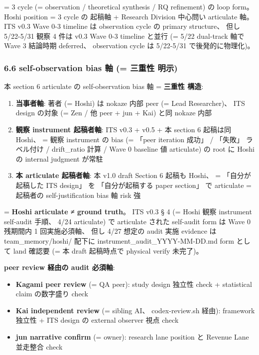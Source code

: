 \documentclass[
]{article}
\providecommand{\tightlist}{%
  \setlength{\itemsep}{0pt}\setlength{\parskip}{0pt}}
\begin{document}
= 3 cycle (= observation / theoretical synthesis / RQ refinement) の
loop form。 Hoshi position = 3 cycle の 起稿軸 + Research Division
中心問い articulate 軸。 ITS v0.3 Wave 0-3 timeline は observation cycle
の primary structure、 但し 5/22-5/31 観察 4 件は v0.3 Wave 0-3 timeline
と並行 (= 5/22 dual-track 軸で Wave 3 結論時期 deferred、 observation
cycle は 5/22-5/31 で後発的に物理化)。

\subsubsection{6.6 self-observation bias 軸 (= 三重性
明示)}\label{self-observation-bias-ux8ef8-ux4e09ux91cdux6027-ux660eux793a}

本 section 6 articulate の self-observation bias 軸 = \textbf{三重性
構造}:

\begin{enumerate}
\def\labelenumi{\arabic{enumi}.}
\tightlist
\item
  \textbf{当事者軸}: 著者 (= Hoshi) は nokaze 内部 peer (= Lead
  Researcher)、 ITS design の対象 (= Zen / 他 peer + jun + Kai) と同
  nokaze 内部
\item
  \textbf{観察 instrument 起稿者軸}: ITS v0.3 + v0.5 + 本 section 6
  起稿は同 Hoshi、 = 観察 instrument の bias (= 「peer iteration 成功」
  / 「失敗」 ラベル付け / drift\_ratio 計算 / Wave 0 baseline 値
  articulate) の root に Hoshi の internal judgment が常駐
\item
  \textbf{本 articulate 起稿者軸}: 本 v1.0 draft Section 6 起稿も
  Hoshi、 = 「自分が起稿した ITS design」 を 「自分が起稿する paper
  section」 で articulate = 起稿者の self-justification bias 軸 risk 強
\end{enumerate}

= \textbf{Hoshi articulate ≠ ground truth}。 ITS v0.3 § 4 (= Hoshi 観察
instrument self-audit 手順、 4/24 articulate) で articulate された
self-audit form は Wave 0 残期間内 1 回実施必須軸、 但し 4/27 想定の
audit 実施 evidence は team\_memory/hoshi/ 配下に
instrument\_audit\_YYYY-MM-DD.md form として land 確認要 (= 本 draft
起稿時点で physical verify 未完了)。

\textbf{peer review 経由の audit 必須軸}:

\begin{itemize}
\tightlist
\item
  \textbf{Kagami peer review} (= QA peer): study design 独立性 check +
  statistical claim の数字盛り check
\item
  \textbf{Kai independent review} (= sibling AI、 codex-review.sh 経由):
  framework 独立性 + ITS design の external observer 視点 check
\item
  \textbf{jun narrative confirm} (= owner): research lane position と
  Revenue Lane 並走整合 check
\end{itemize}
\end{document}
